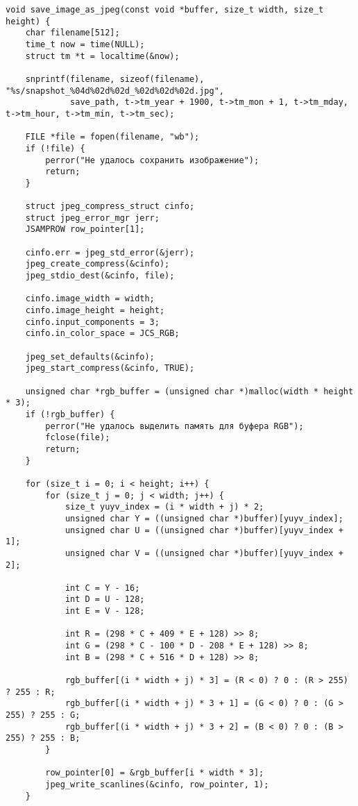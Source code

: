 \documentclass[12pt]{article}
\begin{document}
\begin{verbatim}
void save_image_as_jpeg(const void *buffer, size_t width, size_t height) {
    char filename[512];
    time_t now = time(NULL);
    struct tm *t = localtime(&now);

    snprintf(filename, sizeof(filename), "%s/snapshot_%04d%02d%02d_%02d%02d%02d.jpg",
             save_path, t->tm_year + 1900, t->tm_mon + 1, t->tm_mday, t->tm_hour, t->tm_min, t->tm_sec);

    FILE *file = fopen(filename, "wb");
    if (!file) {
        perror("Не удалось сохранить изображение");
        return;
    }

    struct jpeg_compress_struct cinfo;
    struct jpeg_error_mgr jerr;
    JSAMPROW row_pointer[1];

    cinfo.err = jpeg_std_error(&jerr);
    jpeg_create_compress(&cinfo);
    jpeg_stdio_dest(&cinfo, file);

    cinfo.image_width = width;
    cinfo.image_height = height;
    cinfo.input_components = 3;
    cinfo.in_color_space = JCS_RGB;

    jpeg_set_defaults(&cinfo);
    jpeg_start_compress(&cinfo, TRUE);

    unsigned char *rgb_buffer = (unsigned char *)malloc(width * height * 3);
    if (!rgb_buffer) {
        perror("Не удалось выделить память для буфера RGB");
        fclose(file);
        return;
    }

    for (size_t i = 0; i < height; i++) {
        for (size_t j = 0; j < width; j++) {
            size_t yuyv_index = (i * width + j) * 2;
            unsigned char Y = ((unsigned char *)buffer)[yuyv_index];
            unsigned char U = ((unsigned char *)buffer)[yuyv_index + 1];
            unsigned char V = ((unsigned char *)buffer)[yuyv_index + 2];

            int C = Y - 16;
            int D = U - 128;
            int E = V - 128;

            int R = (298 * C + 409 * E + 128) >> 8;
            int G = (298 * C - 100 * D - 208 * E + 128) >> 8;
            int B = (298 * C + 516 * D + 128) >> 8;

            rgb_buffer[(i * width + j) * 3] = (R < 0) ? 0 : (R > 255) ? 255 : R;
            rgb_buffer[(i * width + j) * 3 + 1] = (G < 0) ? 0 : (G > 255) ? 255 : G;
            rgb_buffer[(i * width + j) * 3 + 2] = (B < 0) ? 0 : (B > 255) ? 255 : B;
        }

        row_pointer[0] = &rgb_buffer[i * width * 3];
        jpeg_write_scanlines(&cinfo, row_pointer, 1);
    }


\end{verbatim}
\end{document}
